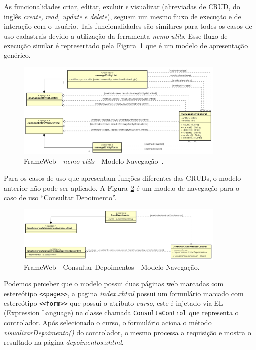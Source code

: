 As funcionalidades criar, editar, excluir e visualizar (abreviadas de CRUD, do inglês \textit{create, read, update e delete}), seguem um mesmo fluxo de execução e de interação com o usuário. Tais funcionalidades são similares para todos os casos de uso cadastrais devido a utilização da ferramenta \textit{nemo-utils}. Esse fluxo de execução similar é representado pela Figura~\ref{fig-projeto-nemo-utils-modelo-navegacao} que é um modelo de apresentação genérico.

\begin{figure}[h]
	\centering
	\includegraphics[width=0.9\textwidth]{figuras/projeto/fig-projeto-nemo-utils-modelo-navegacao}
	\caption{FrameWeb - \textit{nemo-utils} - Modelo Navegação~\cite{lima-pg15}.}
	\label{fig-projeto-nemo-utils-modelo-navegacao}
\end{figure}




Para os casos de uso que apresentam funções diferentes das CRUDs, o modelo anterior não pode ser aplicado. A Figura~\ref{fig-projeto-modelo-navegacao-consultarDepoimento} é um modelo de navegação para o caso de uso “Consultar Depoimento”. 

\begin{figure}[h]
	\centering
	\includegraphics[width=0.9\textwidth]{figuras/projeto/fig-projeto-modelo-navegacao-consultarDepoimento}
	\caption{FrameWeb - Consultar Depoimentos - Modelo Navegação.}
	\label{fig-projeto-modelo-navegacao-consultarDepoimento}
\end{figure}


Podemos perceber que o modelo possui duas páginas web marcadas com estereótipo \texttt{<<page>>}, a pagina \textit{index.xhtml} possui um formulário marcado com estereótipo \texttt{<<form>>} que possui o atributo \textit{curso}, este é injetado via EL (Expression Language) na classe chamada \texttt{ConsultaControl} que representa o controlador. Após selecionado o curso, o formulário aciona o método \textit{visualizarDepoimento()} do controlador, o mesmo processa a requisição e mostra o resultado na página \textit{depoimentos.xhtml}.  






